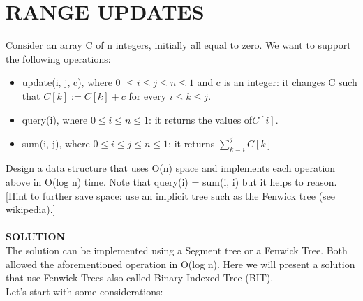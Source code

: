 \documentclass[a4paper]{article}
\begin{document}
\section*{RANGE UPDATES}
Consider an array C of n integers, initially all equal to zero. We want to support the following operations:
\begin{itemize}
\item update(i, j, c), where 0 $\leq i \leq j \leq n \leq 1$ and c is an integer: it changes C such
that $C[k] := C[k] + c$ for every $i \leq k \leq j$.
\item query(i), where $0 \leq i \leq n \leq 1$: it returns the values of$ C[i]$.
\item sum(i, j), where $0 \leq i \leq j \leq n \leq 1$: it returns $\sum_{k=i}^{j} C[k]$
\end{itemize}
Design a data structure that uses O(n) space and implements each operation above in O(log n) time. Note that query(i) = sum(i, i) but it helps to reason. [Hint to further save space: use an implicit tree such as the Fenwick tree (see wikipedia).]\\
\\
\textbf{SOLUTION}
\\
The solution can be implemented using a Segment tree or a Fenwick Tree. Both allowed the aforementioned operation in O(log n). Here we will present a solution that use Fenwick Trees also called Binary Indexed Tree (BIT).\\
Let's start with some considerations: 
\end{document}
